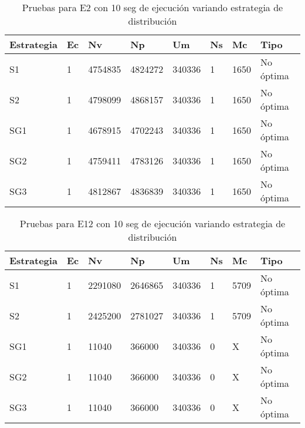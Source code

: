 \begin{center}
\begin{longtable}{|p{3cm}|p{1.0cm}|p{1.6cm}|p{1.6cm}|p{1.1cm}|p{1.1cm}|p{1.1cm}|p{2.7cm}|}
	\caption{Pruebas para E2 con 10 seg de ejecución variando estrategia de distribución} \\
	\hline
	\cellcolor[gray]{0.9} \textbf{Estrategia} & \cellcolor[gray]{0.9}\textbf{Ec} & \cellcolor[gray]{0.9}\textbf{Nv} & \cellcolor[gray]{0.9}\textbf{Np} & \cellcolor[gray]{0.9}\textbf{Um} & \cellcolor[gray]{0.9}\textbf{Ns} &  \cellcolor[gray]{0.9}\textbf{Mc} & \cellcolor[gray]{0.9}\textbf{Tipo}\\	\hline
	S1& 1 &4754835  &4824272 &340336  &1 &1650&No óptima \\
	\hline
	S2& 1 &4798099  &4868157 &340336  &1 &1650&No óptima \\
	\hline
	SG1& 1 &4678915  &4702243 &340336  &1 &1650&No óptima \\
	\hline
	SG2& 1 &4759411  &4783126 &340336  &1 &1650&No óptima \\
	\hline
	SG3& 1 &4812867  &4836839 &340336  &1 &1650&No óptima \\
	\hline
\end{longtable}	
\end{center}

\begin{center}
\begin{longtable}{|p{3cm}|p{1.0cm}|p{1.6cm}|p{1.6cm}|p{1.1cm}|p{1.1cm}|p{1.1cm}|p{2.7cm}|}
	\caption{Pruebas para E12 con 10 seg de ejecución variando estrategia de distribución} \\
	\hline
	\cellcolor[gray]{0.9} \textbf{Estrategia} & \cellcolor[gray]{0.9}\textbf{Ec} & \cellcolor[gray]{0.9}\textbf{Nv} & \cellcolor[gray]{0.9}\textbf{Np} & \cellcolor[gray]{0.9}\textbf{Um} & \cellcolor[gray]{0.9}\textbf{Ns} &  \cellcolor[gray]{0.9}\textbf{Mc} & \cellcolor[gray]{0.9}\textbf{Tipo}\\	\hline
	S1& 1 &2291080  &2646865 &340336  &1 &5709&No óptima \\
	\hline
	S2& 1 &2425200  &2781027 &340336  &1 &5709&No óptima \\
	\hline
	SG1& 1 &11040  &366000 &340336  &0 &X&No óptima \\
	\hline
	SG2& 1 &11040  &366000 &340336  &0 &X&No óptima \\
	\hline
	SG3& 1 &11040  &366000 &340336  &0 &X&No óptima \\
	\hline
\end{longtable}	
\end{center}


